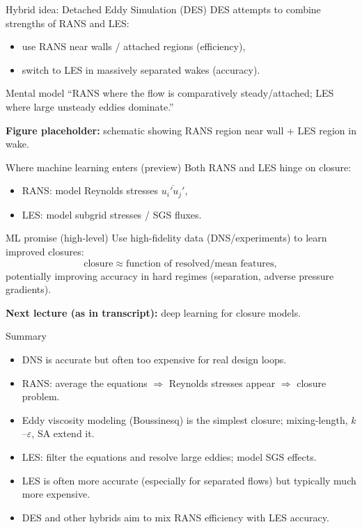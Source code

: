\documentclass[aspectratio=169]{beamer}
\newcommand{\avg}[1]{\overline{#1}}
\begin{document}
\begin{frame}{Hybrid idea: Detached Eddy Simulation (DES)}
DES attempts to combine strengths of RANS and LES:
\begin{itemize}
  \item use RANS near walls / attached regions (efficiency),
  \item switch to LES in massively separated wakes (accuracy).
\end{itemize}

\begin{block}{Mental model}
``RANS where the flow is comparatively steady/attached; LES where large unsteady eddies dominate.''
\end{block}

\textbf{Figure placeholder:} schematic showing RANS region near wall + LES region in wake.
\end{frame}

\begin{frame}{Where machine learning enters (preview)}
Both RANS and LES hinge on closure:
\begin{itemize}
  \item RANS: model Reynolds stresses $\avg{u_i' u_j'}$,
  \item LES: model subgrid stresses / SGS fluxes.
\end{itemize}

\begin{block}{ML promise (high-level)}
Use high-fidelity data (DNS/experiments) to learn improved closures:
\[
\text{closure} \approx \text{function of resolved/mean features},
\]
potentially improving accuracy in hard regimes (separation, adverse pressure gradients).
\end{block}

\textbf{Next lecture (as in transcript):} deep learning for closure models.
\end{frame}

\begin{frame}{Summary}
\begin{itemize}
  \item DNS is accurate but often too expensive for real design loops.
  \item RANS: average the equations $\Rightarrow$ Reynolds stresses appear $\Rightarrow$ closure problem.
  \item Eddy viscosity modeling (Boussinesq) is the simplest closure; mixing-length, $k$--$\varepsilon$, SA extend it.
  \item LES: filter the equations and resolve large eddies; model SGS effects.
  \item LES is often more accurate (especially for separated flows) but typically much more expensive.
  \item DES and other hybrids aim to mix RANS efficiency with LES accuracy.
\end{itemize}
\end{frame}
\end{document}
